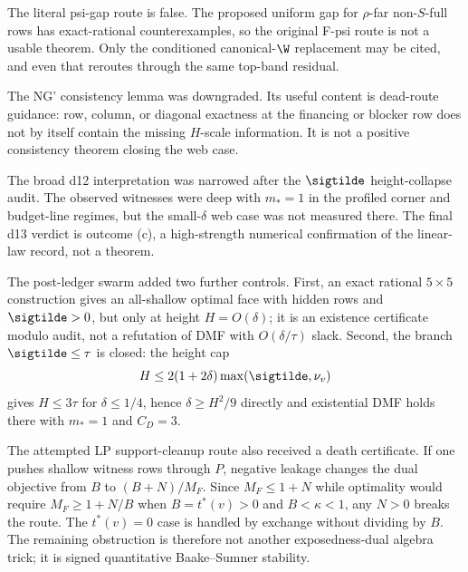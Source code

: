 \begin{refutedstatement}
 The literal psi-gap route is false.  The proposed uniform gap
for $\rho$-far non-$S$-full rows has exact-rational counterexamples, so the
original F-psi route is not a usable theorem.  Only the conditioned
canonical-$\W$ replacement may be cited, and even that reroutes through the
same top-band residual.
\end{refutedstatement}

\begin{downgradedstatement}
\downgradedbadge{} The NG' consistency lemma was downgraded.  Its useful
content is dead-route guidance: row, column, or diagonal exactness at the
financing or blocker row does not by itself contain the missing $H$-scale
information.  It is not a positive consistency theorem closing the web case.
\end{downgradedstatement}

\begin{warning}
\downgradedbadge{} The broad d12 interpretation was narrowed after the
$\sigtilde$ height-collapse audit.  The observed witnesses were deep with
$m_*=1$ in the profiled corner and budget-line regimes, but the small-$\delta$
web case was not measured there.  The final d13 verdict is outcome (c), a
high-strength numerical confirmation of the linear-law record, not a theorem.
\end{warning}

The post-ledger swarm added two further controls.  First, \modauditbadge{} an
exact rational $5\times5$ construction gives an all-shallow optimal face with
hidden rows and $\sigtilde>0$, but only at height $H=O(\delta)$; it is an
existence certificate modulo audit, not a refutation of DMF with
$O(\delta/\tau)$ slack.  Second, \provedbadge{} the branch $\sigtilde\le\tau$
is closed: the height cap
\[
        H\le 2(1+2\delta)\max(\sigtilde,\nu_v)
\]
gives $H\le3\tau$ for $\delta\le1/4$, hence $\delta\ge H^2/9$ directly and
existential DMF holds there with $m_*=1$ and $C_D=3$.

\provedbadge{} The attempted LP support-cleanup route also received a death
certificate.  If one pushes shallow witness rows through $P$, negative leakage
changes the dual objective from $B$ to $(B+N)/M_F$.  Since $M_F\le1+N$ while
optimality would require $M_F\ge1+N/B$ when \(B=t^*(v)>0\) and \(B<\kappa<1\),
any $N>0$ breaks the route.  The \(t^*(v)=0\) case is handled by exchange
without dividing by \(B\).  The remaining obstruction is therefore not another
exposedness-dual algebra trick; it is signed quantitative Baake--Sumner
stability.


